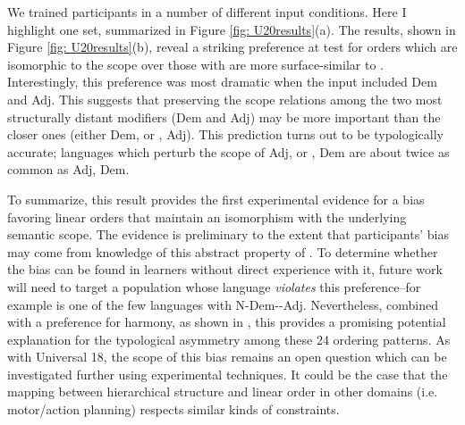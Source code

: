 \documentclass[output=paper]{langsci/langscibook}
\begin{document}
We trained participants in a number of different input conditions. Here I highlight one set, summarized in Figure \ref{fig: U20results}(a). The results, shown in Figure \ref{fig: U20results}(b), reveal a striking preference at test for orders which are isomorphic to the scope over those with are more surface-similar to .  Interestingly, this preference was most dramatic when the input included Dem and Adj. This suggests that preserving the scope relations among the two most structurally distant modifiers (Dem and Adj) may be more important than the closer ones (either Dem,  or , Adj). This prediction turns out to be typologically accurate; languages which perturb the scope of Adj,  or , Dem are about twice as common as Adj, Dem.

To summarize, this result provides the first experimental evidence for a bias  favoring linear orders that maintain an isomorphism with the underlying semantic scope.  The evidence is preliminary to the extent that participants' bias  may come from knowledge of this abstract property of . To determine whether the bias can be found in learners without direct experience with it, future work will need to target a population whose language \textit{violates} this preference--for example  is one of the few languages with N-Dem--Adj. Nevertheless, combined with a preference for harmony, as shown in \cite{CulbertsonSmolenskyLegendre12}, this provides a promising potential explanation for the typological asymmetry among these 24 ordering patterns. As with Universal 18, the scope of this bias remains an open question which can be investigated further using experimental techniques. It could be the case that the mapping between hierarchical structure and linear order in other domains (i.e. motor/action planning) respects similar kinds of constraints.
\end{document}
